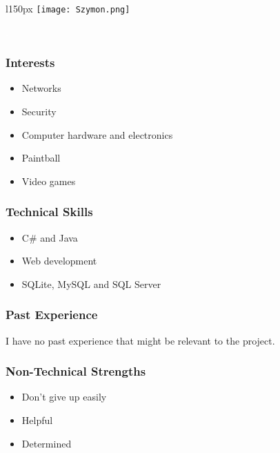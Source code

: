 \begin{wrapfigure}[5]{l}{150px}
\vspace{10pt}
\texttt{[image: Szymon.png]}
\end{wrapfigure}

\textcolor{white}{.}
\subsubsection{Interests}
	\begin{itemize}
		\item Networks
		\item Security
		\item Computer hardware and electronics
		\item Paintball
		\item Video games
	\end{itemize}
\subsubsection{Technical Skills} 
	\begin{itemize}
		\item C\# and Java
		\item Web development
		\item SQLite, MySQL and SQL Server
	\end{itemize}
\subsubsection{Past Experience}
I have no past experience that might be relevant to the project.
\subsubsection{Non-Technical Strengths}
	\begin{itemize}
		\item Don't give up easily
		\item Helpful
		\item Determined
	\end{itemize}